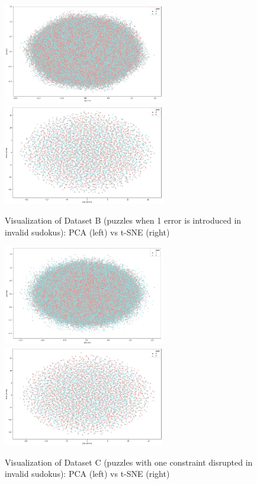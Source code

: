 \documentclass[twoside]{article}
\begin{document}
\begin{figure}
  \centering
  \includegraphics[width=200pt]{sudoku_pca_1error.png}
  \includegraphics[width=200pt]{sudoku_tsne_1error.png}
  \caption{Visualization of Dataset B (puzzles when 1 error is introduced in invalid sudokus): PCA (left) vs t-SNE (right)}
  \label{fig:plot2}
\end{figure}

\begin{figure}
  \centering
  \includegraphics[width=200pt]{sudoku_pca_terror.png}
  \includegraphics[width=200pt]{sudoku_tsne_terror.png}
  \caption{Visualization of Dataset C (puzzles with one constraint disrupted in invalid sudokus): PCA (left) vs t-SNE (right)}
  \label{fig:plot3}
\end{figure}
\end{document}
